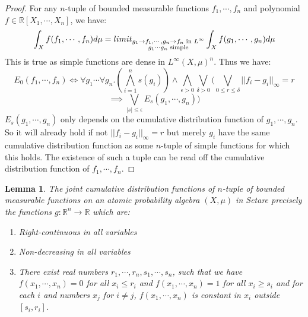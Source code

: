 \documentclass[a4paper]{amsproc}
\theoremstyle{plain}
\newtheorem{lemma}[theorem]{Lemma}
\theoremstyle{definition}
\theoremstyle{remark}
\numberwithin{equation}{section}
\DeclareMathOperator*{\limit}{lim}
\newcommand{\Set}{\textup{\textsf{Set}}}
\begin{document}
\begin{proof}
For any $n$-tuple of bounded measurable functions $f_1,\cdots, f_n$ and polynomial $f\in \mathbb{R}[X_1,\cdots, X_n]$, we have:
\[\int_X f(f_1,\cdots,f_n)d\mu=\\limit_{\substack{g_1\rightarrow f_1,\cdots, g_n\rightarrow f_n \text{ in }L^\infty\\ g_1\cdots g_n \text{ simple}}}  \int_Xf(g_1,\cdots,g_n)d\mu \]%
This is true as simple functions are dense in $L^\infty(X,\mu)^n$. Thus we have:
\[E_0(f_1,\cdots,f_n)\iff \forall g_1\cdots \forall g_n.(\bigwedge_{i=1}^n s(g_i))\wedge\bigwedge_{\epsilon>0}\bigvee_{\delta>0}(\bigvee_{0\leq r\leq \delta}||f_i-g_i||_\infty=r \]
\[\implies\bigvee_{|s|\leq\epsilon} E_s(g_1,\cdots,g_n) )\]%
$E_s(g_1,\cdots,g_n)$ only depends on the cumulative distribution function of $g_1,\cdots,g_n$. So it will already hold if not $||f_i-g_i||_\infty=r$ but merely $g_i$ have the same  cumulative distribution function as some $n$-tuple of simple functions for which this holds. The existence of such a tuple can be read off the cumulative distribution function of $f_1,\cdots,f_n$.%
\end{proof}
\begin{lemma}\label{distribution_L_infty} The joint cumulative distribution functions of $n$-tuple of bounded measurable functions on an atomic probability algebra $(X,\mu)$ in \Set are precisely the functions $g:\mathbb{R}^n\rightarrow \mathbb{R}$ which are:
\begin{enumerate}
\item Right-continuous in all variables
\item Non-decreasing in all variables
\item There exist real numbers $r_1,\cdots,r_n,s_1,\cdots, s_n$, such that we have $f(x_1,\cdots,x_n)=0$ for all $x_i\leq r_i$ and $f(x_1,\cdots,x_n)=1$ for all $x_i\geq s_i$  and for each $i$ and numbers $x_j$ for $i\neq j$, $f(x_1,\cdots,x_n)$ is constant in $x_i$ outside $[s_i,r_i]$.%
\end{enumerate}
\end{lemma}
\end{document}
